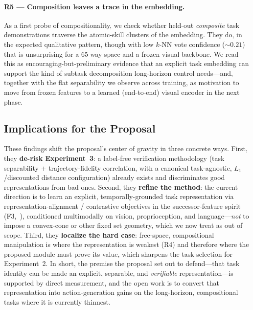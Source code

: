 \paragraph{R5 --- Composition leaves a trace in the embedding.} As a first probe
of compositionality, we check whether held-out \emph{composite} task
demonstrations traverse the atomic-skill clusters of the embedding. They do, in
the expected qualitative pattern, though with low $k$-NN vote confidence
($\sim\!0.21$) that is unsurprising for a $65$-way space and a frozen visual
backbone. We read this as encouraging-but-preliminary evidence that an explicit
task embedding can support the kind of subtask decomposition long-horizon
control needs---and, together with the flat separability we observe across
training, as motivation to move from frozen features to a learned (end-to-end)
visual encoder in the next phase.

\subsection{Implications for the Proposal}
\label{sec:findings:implications}

These findings shift the proposal's center of gravity in three concrete ways.
First, they \textbf{de-risk Experiment~3}: a label-free verification methodology
(task separability $+$ trajectory-fidelity correlation, with a canonical
task-agnostic, $L_1$/discounted distance configuration) already exists and
discriminates good representations from bad ones. Second, they \textbf{refine the
method}: the current direction is to learn an explicit, temporally-grounded task
representation via representation-alignment / contrastive objectives in the
successor-feature spirit (F3,~\cite{tra,infom}), conditioned multimodally on
vision, proprioception, and language---\emph{not} to impose a convex-cone or
other fixed set geometry, which we now treat as out of scope. Third, they
\textbf{localize the hard case}: free-space, compositional manipulation is where
the representation is weakest (R4) and therefore where the proposed module must
prove its value, which sharpens the task selection for Experiment~2. In short,
the premise the proposal set out to defend---that task identity can be made an
explicit, separable, and \emph{verifiable} representation---is supported by
direct measurement, and the open work is to convert that representation into
action-generation gains on the long-horizon, compositional tasks where it is
currently thinnest.

%
